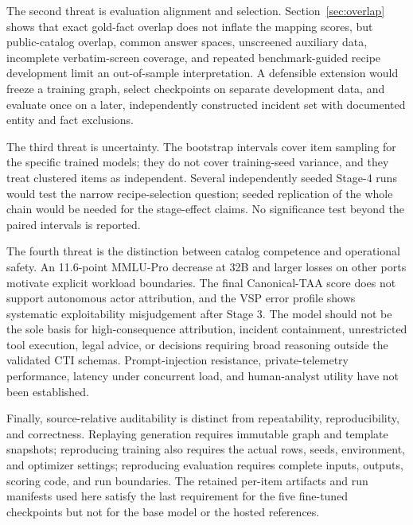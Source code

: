 \documentclass[preprint,12pt,authoryear]{elsarticle}
\begin{document}
The second threat is evaluation alignment and selection. Section~\ref{sec:overlap} shows that exact gold-fact overlap does not inflate the mapping scores, but public-catalog overlap, common answer spaces, unscreened auxiliary data, incomplete verbatim-screen coverage, and repeated benchmark-guided recipe development limit an out-of-sample interpretation. A defensible extension would freeze a training graph, select checkpoints on separate development data, and evaluate once on a later, independently constructed incident set with documented entity and fact exclusions.

The third threat is uncertainty. The bootstrap intervals cover item sampling for the specific trained models; they do not cover training-seed variance, and they treat clustered items as independent. Several independently seeded Stage-4 runs would test the narrow recipe-selection question; seeded replication of the whole chain would be needed for the stage-effect claims. No significance test beyond the paired intervals is reported.

The fourth threat is the distinction between catalog competence and operational safety. An 11.6-point MMLU-Pro decrease at 32B and larger losses on other ports motivate explicit workload boundaries. The final Canonical-TAA score does not support autonomous actor attribution, and the VSP error profile shows systematic exploitability misjudgement after Stage 3. The model should not be the sole basis for high-consequence attribution, incident containment, unrestricted tool execution, legal advice, or decisions requiring broad reasoning outside the validated CTI schemas. Prompt-injection resistance, private-telemetry performance, latency under concurrent load, and human-analyst utility have not been established.

Finally, source-relative auditability is distinct from repeatability, reproducibility, and correctness. Replaying generation requires immutable graph and template snapshots; reproducing training also requires the actual rows, seeds, environment, and optimizer settings; reproducing evaluation requires complete inputs, outputs, scoring code, and run boundaries. The retained per-item artifacts and run manifests used here satisfy the last requirement for the five fine-tuned checkpoints but not for the base model or the hosted references.
\end{document}
